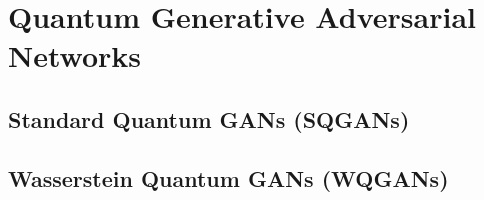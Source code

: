 \chapter{Quantum Generative Adversarial Networks}\label{chapter:quantum_gans}
\section{Standard Quantum GANs (SQGANs)}
\section{Wasserstein Quantum GANs (WQGANs)}